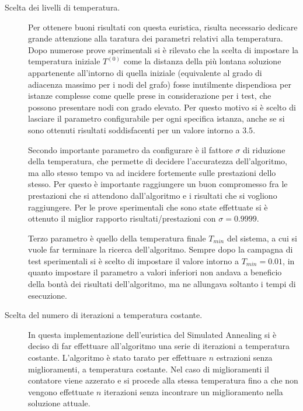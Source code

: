 \documentclass[a4paper,10pt]{article}
\begin{document}
\begin{description}
 \item[Scelta dei livelli di temperatura.] Per ottenere buoni risultati con questa euristica, risulta necessario dedicare grande attenzione alla taratura dei parametri relativi alla temperatura. Dopo numerose prove sperimentali si è rilevato che la scelta di impostare la temperatura iniziale $T^{(0)}$ come la distanza della più lontana soluzione appartenente all'intorno di quella iniziale (equivalente al grado di adiacenza massimo per i nodi del grafo) fosse inutilmente dispendiosa per istanze complesse come quelle prese in considerazione per i test, che possono presentare nodi con grado elevato. Per questo motivo si è scelto di lasciare il parametro configurabile per ogni specifica istanza, anche se si sono ottenuti risultati soddisfacenti per un valore intorno a $3.5$.

Secondo importante parametro da configurare è il fattore $\sigma$ di riduzione della temperatura, che permette di decidere l'accuratezza dell'algoritmo, ma allo stesso tempo va ad incidere fortemente sulle prestazioni dello stesso. Per questo è importante raggiungere un buon compromesso fra le prestazioni che si attendono dall'algoritmo e i risultati che si vogliono raggiungere. Per le prove sperimentali che sono state effettuate si è ottenuto il miglior rapporto risultati/prestazioni con $\sigma=0.9999$.

Terzo parametro è quello della temperatura finale $T_{min}$ del sistema, a cui si vuole far terminare la ricerca dell'algoritmo. Sempre dopo la campagna di test sperimentali si è scelto di impostare il valore intorno a $T_{min}=0.01$, in quanto impostare il parametro a valori inferiori non andava a beneficio della bontà dei risultati dell'algoritmo, ma ne allungava soltanto i tempi di esecuzione.

\item[Scelta del numero di iterazioni a temperatura costante.]In questa implementazione dell'euristica del Simulated Annealing si è deciso di far effettuare all'algoritmo una serie di iterazioni a temperatura costante. L'algoritmo è stato tarato per effettuare $n$ estrazioni senza miglioramenti, a temperatura costante. Nel caso di miglioramenti il contatore viene azzerato e si procede alla stessa temperatura fino a che non vengono effettuate $n$ iterazioni senza incontrare un miglioramento nella soluzione attuale.


\end{description}
\end{document}

